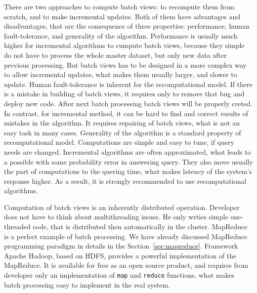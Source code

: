 There are two approaches to compute batch views: to recompute them from scratch, and to make incremental updates.
Both of them have advantages and disadvantages, that are the consequence of three properties: performance, human fault-tolerance, and generality of the algorithm.
Performance is usually much higher for incremental algorithms to cumpute batch views, because they simple do not have to process the whole master dataset, but only new data after previous processing.
But batch views has to be designed in a more complex way to allow incremental updates, what makes them usually larger, and slower to update.
Human fault-tolerance is inherent for the recomputational model.
If there is a mistake in building of batch views, it requires only to remove that bug and deploy new code.
After next batch processing batch views will be properly creted.
In contrast, for incremental method, it can be hard to find and correct results of mistakes in the algorithm.
It requires repairing of batch views, what is not an easy task in many cases.
Generality of the algorithm is a standard property of recomputational model.
Computations are simple and easy to tune, if query needs are changed.
Incremental algorithms are often approximated, what leads to a possible with some probability error in answering query.
They also move usually the part of computations to the quering time, what makes latency of the system's response higher.
As a result, it is strongly recommended to use recomputational algorithms.

Computation of batch views is an inherently distributed operation.
Developer does not have to think about multithreading issues.
He only wrties simple one-threaded code, that is distributed then automatically in the cluster.
MapReduce is a perfect example of batch processing.
We have already discussed MapReduce programming paradigm in details in the Section~\ref{sec:mapreduce}.
Framework Apache Hadoop, based on HDFS, provides a powerful implementation of the MapReduce.
It is available for free as an open source product, and requires from developer only an implementation of \lstinline{map} and \lstinline{reduce} functions, what makes batch processing easy to implement in the real system.